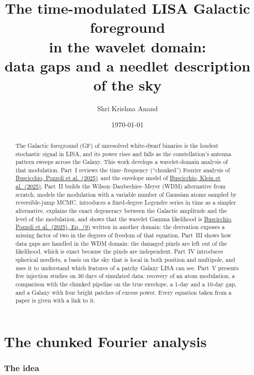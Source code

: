 \documentclass[11pt,a4paper]{article}
\title{The time-modulated LISA Galactic foreground\\ in the wavelet domain:\\ data gaps and a needlet description of the sky}
\author{Shri Krishna Anand}
\date{\today}
\newcommand{\urlPone}{https://arxiv.org/pdf/2511.03604}
\newcommand{\urlPtwo}{https://arxiv.org/pdf/2410.08263}
\newcommand{\Pone}{\href{\urlPone}{Buscicchio, Pozzoli et al.~(2025)}}
\newcommand{\Ptwo}{\href{\urlPtwo}{Buscicchio, Klein et al.~(2025)}}
\newcommand{\PoneEq}[1]{\href{\urlPone}{Buscicchio, Pozzoli et al.~(2025), Eq.~(#1)}}
\begin{document}
\maketitle

\begin{abstract}
\noindent
The Galactic foreground (GF) of unresolved white-dwarf binaries is the loudest
stochastic signal in LISA, and its power rises and falls as the constellation's
antenna pattern sweeps across the Galaxy. This work develops a wavelet-domain
analysis of that modulation. Part~I reviews the time--frequency (``chunked'') Fourier
analysis of \Pone\ and the envelope model of \Ptwo. Part~II builds the
Wilson--Daubechies--Meyer (WDM) alternative from scratch, models the modulation with a
variable number of Gaussian atoms sampled by reversible-jump MCMC, introduces a
fixed-degree Legendre series in time as a simpler alternative, explains the exact
degeneracy between the Galactic amplitude and the level of the modulation, and shows
that the wavelet Gamma likelihood is \PoneEq{9} written in another domain; the derivation
exposes a missing factor of two in the degrees of freedom of that equation. Part~III
shows how data gaps are handled in the WDM domain: the damaged pixels are left out of
the likelihood, which is exact because the pixels are independent. Part~IV introduces
spherical needlets, a basis on the sky that is local in both position and multipole,
and uses it to understand which features of a patchy Galaxy LISA can see. Part~V
presents five injection studies on 30 days of simulated data: recovery of an atom
modulation, a comparison with the chunked pipeline on the true envelope, a 1-day and
a 10-day gap, and a Galaxy with four bright patches of excess power. Every equation
taken from a paper is given with a link to it.
\end{abstract}

{\small
\setcounter{tocdepth}{0}
\tableofcontents}

\part{The chunked Fourier analysis}

\section{The idea}
\end{document}
